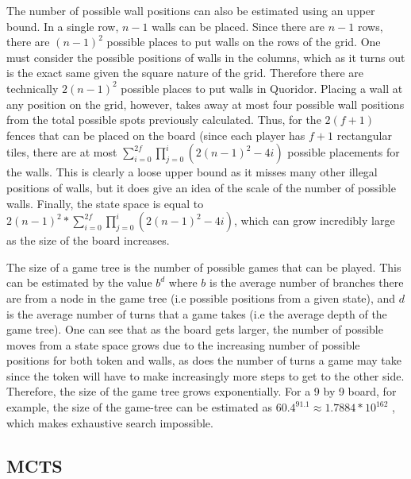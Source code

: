 \documentclass[journal, a4paper]{IEEEtran}
\begin{document}
The number of possible wall positions can also be estimated using an upper bound. In a single row, $n-1$ walls can be placed. Since there are $n-1$ rows, there are $(n-1)^{2}$ possible places to put walls on the rows of the grid. One must consider the possible positions of walls in the columns, which as it turns out is the exact same given the square nature of the grid. Therefore there are technically $2(n-1)^{2}$ possible places to put walls in Quoridor. 
Placing a wall at any position on the grid, however, takes away at most four possible wall positions from the total possible spots previously calculated. Thus, for the $2(f+1)$ fences that can be placed on the board (since each player has $f+1$ rectangular tiles, there are at most $\sum_{i=0}^{2f} \prod_{j=0}^{i}(2(n-1)^2 - 4i)$ possible placements for the walls. This is clearly a loose upper bound as it misses many other illegal positions of walls, but it does give an idea of the scale of the number of possible walls. Finally, the state space is equal to $2(n-1)^{2} * \sum_{i=0}^{2f} \prod_{j=0}^{i}(2(n-1)^2 - 4i)$, which can grow incredibly large as the size of the board increases.

The size of a game tree is the number of possible games that can be played. This can be estimated by the value $b^{d}$ where $b$ is the average number of branches there are from a node in the game tree (i.e possible positions from a given state), and $d$ is the average number of turns that a game takes (i.e the average depth of the game tree). One can see that as the board gets larger, the number of possible moves from a state space grows due to the increasing number of possible positions for both token and walls, as does the number of turns a game may take since the token will have to make increasingly more steps to get to the other side. 
Therefore, the size of the game tree grows exponentially. For a 9 by 9 board, for example, the size of the game-tree can be estimated as $60.4^{91.1} \approx 1.7884 * 10^{162}$ \cite{mastering-quoridor}, which makes exhaustive search impossible.


\subsection{MCTS}
\label{ssec:mcts}
\end{document}
